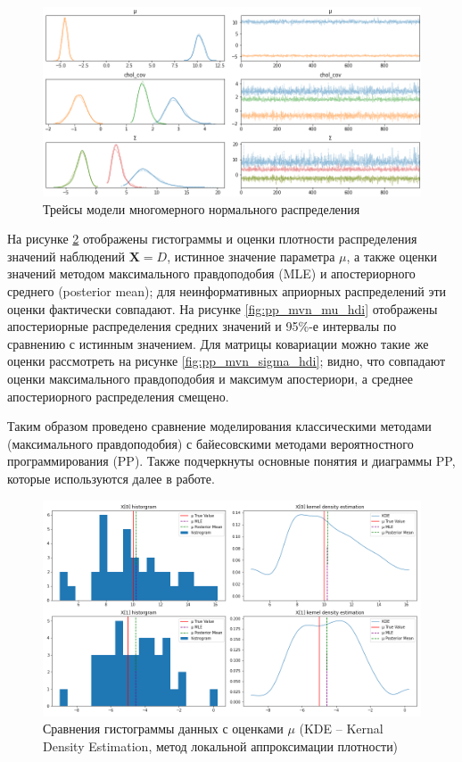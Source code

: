 \documentclass[a4paper,14pt]{extreport}
\begin{document}
\begin{figure}[H]
	\includegraphics[width=\linewidth]{img/gen/pp_mvn_trace.png}
	\caption{Трейсы модели многомерного нормального распределения}
	\label{fig:pp_mvn_trace}
\end{figure}

На рисунке \ref{fig:pp_mvn_mu_comparison} отображены гистограммы и оценки плотности распределения значений наблюдений $\mathbf{X} = D$, истинное значение параметра $\mu$, а также оценки значений методом максимального правдоподобия (MLE) и апостериорного среднего (posterior mean); для неинформативных априорных распределений эти оценки фактически совпадают. На рисунке \ref{fig:pp_mvn_mu_hdi} отображены апостериорные распределения средних значений и 95\%-е интервалы по сравнению с истинным значением. Для матрицы ковариации можно такие же оценки рассмотреть на рисунке \ref{fig:pp_mvn_sigma_hdi}; видно, что совпадают оценки максимального правдоподобия и максимум апостериори, а среднее апостериорного распределения смещено.

Таким образом проведено сравнение моделирования классическими методами (максимального правдоподобия) с байесовскими методами вероятностного программирования (PP). Также подчеркнуты основные понятия и диаграммы PP, которые используются далее в работе.

\begin{figure}[H]
	\includegraphics[width=\linewidth]{img/gen/pp_mvn_mu_comparison.png}
	\caption{Сравнения гистограммы данных с оценками $\mu$ (KDE -- Kernal Density Estimation, метод локальной аппроксимации плотности)}
	\label{fig:pp_mvn_mu_comparison}
\end{figure}
\end{document}
